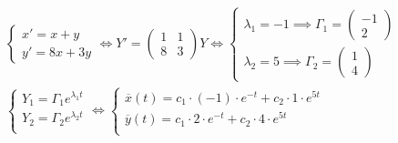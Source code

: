 \begin{align*}
  \begin{cases}
    x' = x + y \\
    y' = 8x + 3y
  \end{cases} \iff
  Y' = \begin{pmatrix}
    1 & 1 \\
    8 & 3
  \end{pmatrix} Y \iff
  \begin{cases}
    \lambda_{1} = -1
      \implies \Gamma_{1} = \begin{pmatrix} -1 \\ 2 \end{pmatrix}
    \\
    \lambda_{2} = 5
      \implies \Gamma_{2} = \begin{pmatrix} 1 \\ 4 \end{pmatrix}
  \end{cases} \\
  \begin{cases}
    Y_{1} = \Gamma_{1} e^{\lambda_{1} t}  \\
    Y_{2} = \Gamma_{2} e^{\lambda_{2} t}  \\
  \end{cases} \iff
  \begin{cases}
    \overline{x}(t)
      = c_{1} \cdot (-1) \cdot e^{-t}
      + c_{2} \cdot 1 \cdot e^{5t}
    \\
    \overline{y}(t)
      = c_{1} \cdot 2 \cdot e^{-t}
      + c_{2} \cdot 4 \cdot e^{5t}
    \\
  \end{cases}
\end{align*}

